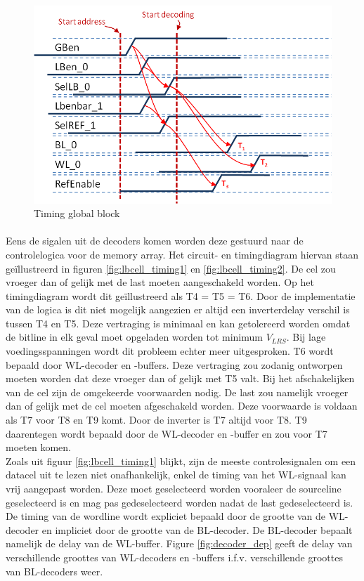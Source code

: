 \begin{figure}[!ht]
  \centering
  \includegraphics[scale=0.9]{../fig/hfdstk-timing-gb2.png}
  \caption[Global block:timing]{Timing global block}
  \label{fig:gb_timing2}
\end{figure}

\paragraph{}
Eens de sigalen uit de decoders komen worden deze gestuurd naar de controlelogica voor de memory array. Het circuit- en timingdiagram hiervan staan geïllustreerd in figuren \ref{fig:lbcell_timing1} en \ref{fig:lbcell_timing2}. De cel zou vroeger dan of gelijk met de last moeten aangeschakeld worden. Op het timingdiagram wordt dit geïllustreerd als T4 = T5 = T6. Door de implementatie van de logica is dit niet mogelijk aangezien er altijd een inverterdelay verschil is tussen T4 en T5. Deze vertraging is minimaal en kan getolereerd worden omdat de bitline in elk geval moet opgeladen worden tot minimum $V_{LRS}$. Bij lage voedingsspanningen wordt dit probleem echter meer uitgesproken. T6 wordt bepaald door WL-decoder en -buffers. Deze vertraging zou zodanig ontworpen moeten worden dat deze vroeger dan of gelijk met T5 valt. Bij het afschakelijken van de cel zijn de omgekeerde voorwaarden nodig. De last zou namelijk vroeger dan of gelijk met de cel moeten afgeschakeld worden. Deze voorwaarde is voldaan als T7 voor T8 en T9 komt. Door de inverter is T7 altijd voor T8. T9 daarentegen wordt bepaald door de WL-decoder en -buffer en zou voor T7 moeten komen. \\
Zoals uit figuur \ref{fig:lbcell_timing1} blijkt, zijn de meeste controlesignalen om een datacel uit te lezen niet onafhankelijk, enkel de timing van het WL-signaal kan vrij aangepast worden. Deze moet geselecteerd worden vooraleer de sourceline geselecteerd is en mag pas gedeselecteerd worden nadat de last gedeselecteerd is. \\
De timing van de wordline wordt expliciet bepaald door de grootte van de WL-decoder en impliciet door de grootte van de BL-decoder. De BL-decoder bepaalt namelijk de delay van de WL-buffer. Figure \ref{fig:decoder_dep} geeft de delay van verschillende groottes van WL-decoders en -buffers i.f.v. verschillende groottes van BL-decoders weer.

